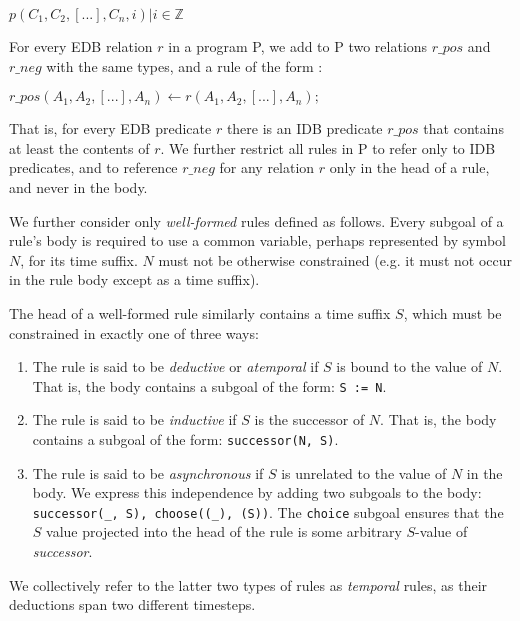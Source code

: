 \documentclass{acm_proc_article-sp-sigmod09}
\newcommand{\wrm}[1]{{\color{BurntOrange}{#1 -- wrm}}}
\newcommand{\dedalus}[1]{\texttt{\fontsize{9pt}{9pt}\selectfont #1}}
\begin{document}
$p(C_{1},C_{2},[...],C_{n}, i) |  i \in \mathbb{Z}$

For every EDB relation $r$ in a program P, we add to P two relations $r\_pos$ and $r\_neg$ with the same types, and a rule of the form \wrm{is this fundamental to the language, or is it just a rewrite that we do for operational purposes}:

$r\_pos(A_1, A_2, [...], A_n) \leftarrow r(A_1, A_2, [...], A_n);$

That is, for every EDB predicate $r$ there is an IDB predicate $r\_pos$ that contains at least the contents of $r$.
We further restrict all rules in P to refer only to IDB predicates, and to reference $r\_neg$ for any relation $r$ only 
in the head of a rule, and never in the body.  

We further consider only \emph{well-formed} rules defined as follows.  Every
subgoal of a rule's body is required to use a common variable, perhaps
represented by symbol $N$, for its time suffix.  $N$ must not be otherwise
constrained (e.g. it must not occur in the rule body except as a time suffix).

The head of a well-formed rule similarly contains a time suffix $S$, which must
be constrained in exactly one of three ways:

\begin{enumerate}

\item The rule is said to be \emph{deductive} or {\em atemporal} if $S$ is
bound to the value of $N$.  That is, the body contains a subgoal of the form:
\dedalus{S := N}.

\item The rule is said to be {\em inductive} if $S$ is the successor
of $N$.  That is, the body contains a subgoal of the form:
\dedalus{successor(N, S)}.

\item The rule is said to be {\em asynchronous} if $S$ is unrelated to the
value of $N$ in the body.  We express this independence by adding two subgoals
to the body: \dedalus{successor(\_, S), choose((\_), (S))}.  The
\dedalus{choice} subgoal ensures that the $S$ value projected into the head of
the rule is some arbitrary $S$-value of \emph{successor}. \wrm{Why can't we
select the initial time?  What we should do instead is have some unary relation
time(T) that captures all possible times, and choose from this relation
instead.  We can assume an inclusion constraint forcing successor's arguments
to both come from this relation.}

\end{enumerate}

We collectively refer to the latter two types of rules as {\em temporal} rules,
as their deductions span two different timesteps.

\subsection{}
\end{document}
